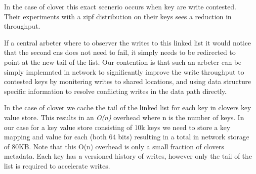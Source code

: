 In the case of clover this exact scenerio occurs when key are write
contested. Their experiments with a zipf distribution on their keys
sees a  reduction in throughput.

If a central arbeter where to observer the writes to this linked list
it would notice that the second cns does not need to fail, it simply
needs to be redirected to point at the new tail of the list. Our
contention is that such an arbeter can be simply implemnted in network
to significantly improve the write throughput to contested keys by
monitering writes to shared locations, and using data structure
specific information to resolve conflicting writes in the data path
directly.

In the case of clover we cache the tail of the linked list for each
key in clovers key value store. This results in an \textit{O(n)}
overhead where n is the number of keys. In our case for a key value
store consisting of 10k keys we need to store a key mapping and value
for each (both 64 bits) resulting in a total in network storage of
80KB. Note that this O(n) overhead is only a small fraction of clovers
metadata. Each key has a versioned history of writes, however only the
tail of the list is required to accelerate writes.






